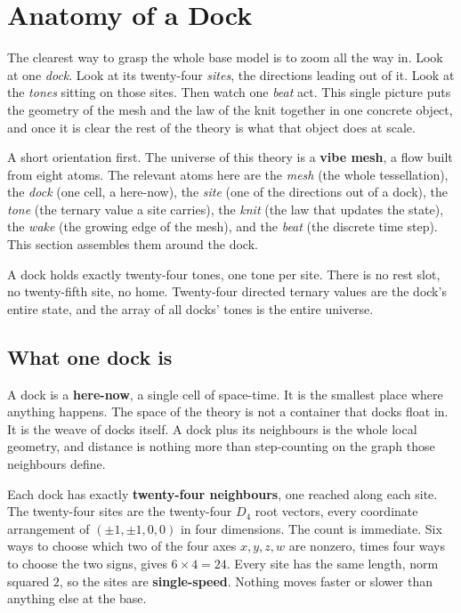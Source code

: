 \section{Anatomy of a Dock}

The clearest way to grasp the whole base model is to zoom all the way in. Look at one \emph{dock}. Look at its twenty-four \emph{sites}, the directions leading out of it. Look at the \emph{tones} sitting on those sites. Then watch one \emph{beat} act. This single picture puts the geometry of the mesh and the law of the knit together in one concrete object, and once it is clear the rest of the theory is what that object does at scale.

A short orientation first. The universe of this theory is a \textbf{vibe mesh}, a flow built from eight atoms. The relevant atoms here are the \emph{mesh} (the whole tessellation), the \emph{dock} (one cell, a here-now), the \emph{site} (one of the directions out of a dock), the \emph{tone} (the ternary value a site carries), the \emph{knit} (the law that updates the state), the \emph{wake} (the growing edge of the mesh), and the \emph{beat} (the discrete time step). This section assembles them around the dock.

\begin{principle}
A dock holds exactly twenty-four tones, one tone per site. There is no rest slot, no twenty-fifth site, no home. Twenty-four directed ternary values are the dock's entire state, and the array of all docks' tones is the entire universe.
\end{principle}

\subsection{What one dock is}

A dock is a \textbf{here-now}, a single cell of space-time. It is the smallest place where anything happens. The space of the theory is not a container that docks float in. It is the weave of docks itself. A dock plus its neighbours is the whole local geometry, and distance is nothing more than step-counting on the graph those neighbours define.

Each dock has exactly \textbf{twenty-four neighbours}, one reached along each site. The twenty-four sites are the twenty-four $D_4$ root vectors, every coordinate arrangement of $(\pm 1, \pm 1, 0, 0)$ in four dimensions. The count is immediate. Six ways to choose which two of the four axes $x, y, z, w$ are nonzero, times four ways to choose the two signs, gives $6 \times 4 = 24$. Every site has the same length, norm squared $2$, so the sites are \textbf{single-speed}. Nothing moves faster or slower than anything else at the base.


